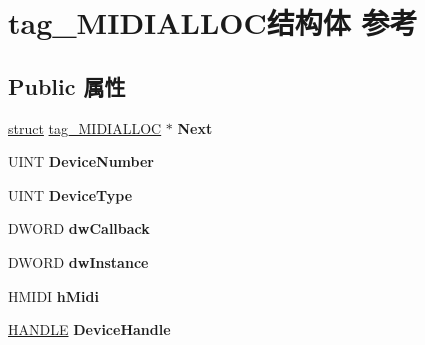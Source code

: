 \hypertarget{structtag___m_i_d_i_a_l_l_o_c}{}\section{tag\+\_\+\+M\+I\+D\+I\+A\+L\+L\+O\+C结构体 参考}
\label{structtag___m_i_d_i_a_l_l_o_c}
\subsection*{Public 属性}
\begin{DoxyCompactItemize}
\item 
\mbox{\label{structtag___m_i_d_i_a_l_l_o_c_a005c2a0de08501dc37b8a3e7e3346c3e}} 
\hyperlink{interfacestruct}{struct} \hyperlink{structtag___m_i_d_i_a_l_l_o_c}{tag\+\_\+\+M\+I\+D\+I\+A\+L\+L\+OC} $\ast$ {\bfseries Next}
\item 
\mbox{\label{structtag___m_i_d_i_a_l_l_o_c_aab947585b0616893505cb09257ca83a4}} 
U\+I\+NT {\bfseries Device\+Number}
\item 
\mbox{\label{structtag___m_i_d_i_a_l_l_o_c_a7d99f1e6760fe4e90de48984de5513d2}} 
U\+I\+NT {\bfseries Device\+Type}
\item 
\mbox{\label{structtag___m_i_d_i_a_l_l_o_c_ac19cc73c5f8c144398d68630f7b6a669}} 
D\+W\+O\+RD {\bfseries dw\+Callback}
\item 
\mbox{\label{structtag___m_i_d_i_a_l_l_o_c_a7bef10a51ce001a23098602224028b75}} 
D\+W\+O\+RD {\bfseries dw\+Instance}
\item 
\mbox{\label{structtag___m_i_d_i_a_l_l_o_c_a49a83882b315f973e9ea322815c72fe8}} 
H\+M\+I\+DI {\bfseries h\+Midi}
\item 
\mbox{\label{structtag___m_i_d_i_a_l_l_o_c_a2c69f8c1c8de6529571f0bc867e58f5d}} 
\hyperlink{interfacevoid}{H\+A\+N\+D\+LE} {\bfseries Device\+Handle}
\item 
\mbox{\label{structtag___m_i_d_i_a_l_l_o_c_a37442ae297fd1e71111cd2d37fb3fb66}} 

\end{DoxyCompactItemize}
